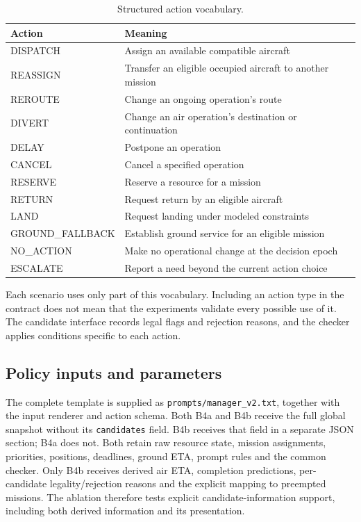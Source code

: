 \documentclass[11pt,a4paper]{article}
\begin{document}
\begin{table}[H]
\centering
\small
\setlength{\tabcolsep}{3pt}
\caption{Structured action vocabulary.}
\label{tab:S9}
\begin{tabularx}{\textwidth}{@{}lY@{}}
\toprule
Action & Meaning \\
\midrule
DISPATCH & Assign an available compatible aircraft \\
REASSIGN & Transfer an eligible occupied aircraft to another mission \\
REROUTE & Change an ongoing operation's route \\
DIVERT & Change an air operation's destination or continuation \\
DELAY & Postpone an operation \\
CANCEL & Cancel a specified operation \\
RESERVE & Reserve a resource for a mission \\
RETURN & Request return by an eligible aircraft \\
LAND & Request landing under modeled constraints \\
GROUND\_FALLBACK & Establish ground service for an eligible mission \\
NO\_ACTION & Make no operational change at the decision epoch \\
ESCALATE & Report a need beyond the current action choice \\
\bottomrule
\end{tabularx}
\end{table}

Each scenario uses only part of this vocabulary. Including an action type in the contract does not mean that the experiments validate every possible use of it. The candidate interface records legal flags and rejection reasons, and the checker applies conditions specific to each action.

\subsection{Policy inputs and parameters}

The complete template is supplied as \nolinkurl{prompts/manager_v2.txt}, together with the input renderer and action schema. Both B4a and B4b receive the full global snapshot without its \nolinkurl{candidates} field. B4b receives that field in a separate JSON section; B4a does not. Both retain raw resource state, mission assignments, priorities, positions, deadlines, ground ETA, prompt rules and the common checker. Only B4b receives derived air ETA, completion predictions, per-candidate legality/rejection reasons and the explicit mapping to preempted missions. The ablation therefore tests explicit candidate-information support, including both derived information and its presentation.
\end{document}
